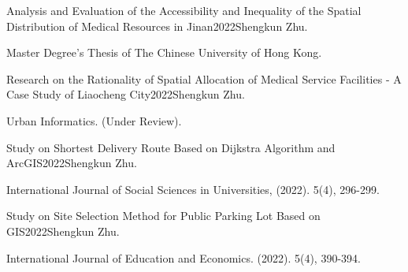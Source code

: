 \documentclass{joel_cv}
\begin{document}
\begin{enumerate}[label={[\arabic*]}]\setlength{\labelsep}{0.5em}\setlength{\itemindent}{0em}%
	

		\item \begin{sectionContentNormal}{Analysis and Evaluation of the Accessibility and Inequality of the Spatial Distribution of Medical Resources in Jinan}{2022}{Shengkun Zhu.}
		\item Master Degree's Thesis of The Chinese University of Hong Kong.

	\end{sectionContentNormal}

		\item \begin{sectionContentNormal}{Research on the Rationality of Spatial Allocation of Medical Service Facilities - A Case Study of Liaocheng City}{2022}{Shengkun Zhu.}
	\item Urban Informatics. (Under Review).%
\end{sectionContentNormal}
	
	\item \begin{sectionContentNormal}{Study on Shortest Delivery Route Based on Dijkstra Algorithm and ArcGIS}{2022}{Shengkun Zhu.}
		\item International Journal of Social Sciences in Universities, (2022). 5(4), 296-299. %
	\end{sectionContentNormal}
	
	\item \begin{sectionContentNormal}{Study on Site Selection Method for Public Parking Lot Based on GIS}{2022}{Shengkun Zhu.}
		\item International Journal of Education and Economics. (2022). 5(4), 390-394.
	\end{sectionContentNormal}
	

\end{enumerate}
\end{document}
